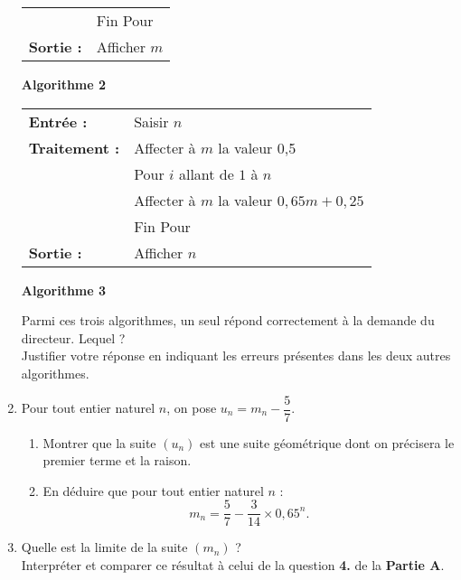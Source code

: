 \begin{enumerate}
\begin{center}
\begin{extern}
\begin{tabular}{|l l|}
                    &Fin Pour\\
                    \textbf{Sortie :}		&Afficher $m$ \\ \hline
               \end{tabular}
          \end{extern}
          \par
          \textbf{Algorithme 2}
     \end{center}
     \begin{center}
          \begin{extern}%
               \begin{tabular}{|l l|}\hline
                    \textbf{Entrée :}	& 	Saisir $n$\\
                    \textbf{Traitement :} & Affecter à $m$ la valeur 0,5\\
                    & Pour $i$ allant de $1$ à $n$\\
                    &\qquad Affecter à $m$ la valeur $0,65m + 0,25$ \\
                    &Fin Pour\\
                    \textbf{Sortie :}		&Afficher $n$ \\ \hline
               \end{tabular}
          \end{extern}
          \par
          \textbf{Algorithme 3}
     \end{center}
     \par
     Parmi ces trois algorithmes, un seul répond correctement à la demande du directeur. Lequel ?\\
     Justifier votre réponse en indiquant les erreurs présentes dans les deux autres algorithmes.
     \item %
     Pour tout entier naturel $n$, on pose $u_n=m_n-\dfrac{5}{7}$.
     \par
     \begin{enumerate}[label=\alph*.]
          \item %
          Montrer que la suite $(u_n)$ est une suite géométrique dont on précisera le premier terme et la raison.
          \item %
          En déduire que pour tout entier naturel $n$ :
          \[ m_n=\dfrac{5}{7}-\dfrac{3}{14} \times 0,65^n. \]
     \end{enumerate}
     \item %
     Quelle est la limite de la suite $(m_n)$ ? \\
     Interpréter et comparer ce résultat à celui de la question \textbf{4.} de la \textbf{Partie A}.
     \par
\end{enumerate}
